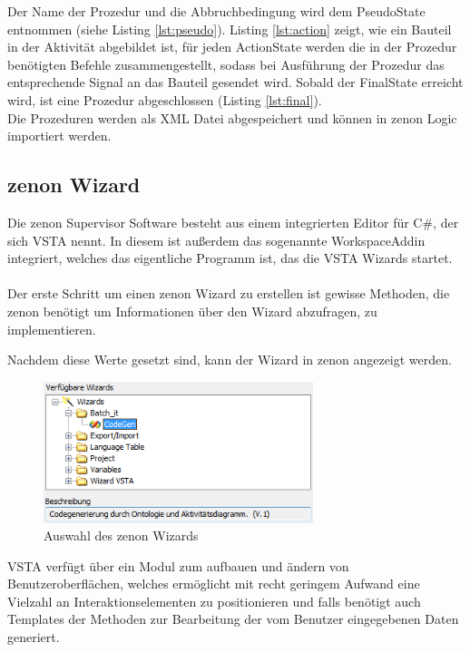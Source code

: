 Der Name der Prozedur und die Abbruchbedingung wird dem PseudoState entnommen (siehe Listing \ref{lst:pseudo}). Listing \ref{lst:action} zeigt, wie ein Bauteil in der Aktivität abgebildet ist, für jeden ActionState werden die in der Prozedur benötigten Befehle zusammengestellt, sodass bei Ausführung der Prozedur das entsprechende Signal an das Bauteil gesendet wird. Sobald der FinalState erreicht wird, ist eine Prozedur abgeschlossen (Listing \ref{lst:final}).\\

Die Prozeduren werden als \ac{XML} Datei abgespeichert und können in zenon Logic importiert werden.

\subsection{zenon Wizard}
Die zenon Supervisor Software besteht aus einem integrierten Editor für C\#, der sich \ac{VSTA} nennt. In diesem ist außerdem das sogenannte WorkspaceAddin integriert, welches das eigentliche Programm ist, das die \ac{VSTA} Wizards startet.\\\\
Der erste Schritt um einen zenon Wizard zu erstellen ist gewisse Methoden, die zenon benötigt um Informationen über den Wizard abzufragen, zu implementieren.


Nachdem diese Werte gesetzt sind, kann der Wizard in zenon angezeigt werden.
\begin{figure}[hbt!]
  \centering
  \includegraphics[width=0.7\textwidth]{graphics/implementation/wizards}
  \caption{Auswahl des zenon Wizards}
\end{figure}

\ac{VSTA} verfügt über ein Modul zum aufbauen und ändern von Benutzeroberflächen, welches ermöglicht mit recht geringem Aufwand eine Vielzahl an Interaktionselementen zu positionieren und falls benötigt auch Templates der Methoden zur Bearbeitung der vom Benutzer eingegebenen Daten generiert.

